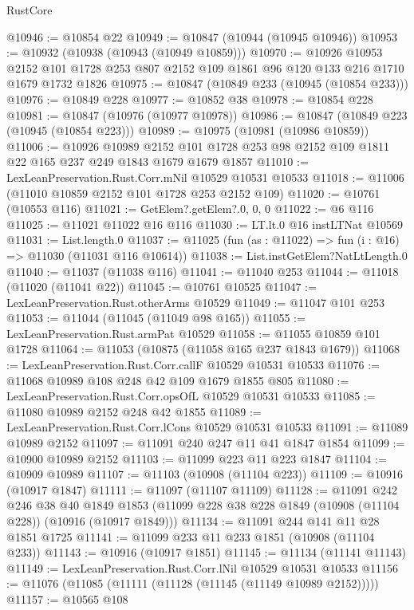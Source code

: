 \begin{lexlean}{RustCore}
\begin{coremodule}
@10946 := @10854 @22
@10949 := @10847 (@10944 (@10945 @10946))
@10953 := @10932 (@10938 (@10943 (@10949 @10859)))
@10970 := @10926
    @10953
    @2152
    @101
    @1728
    @253
    @807
    @2152
    @109
    @1861
    @96
    @120
    @133
    @216
    @1710
    @1679
    @1732
    @1826
@10975 := @10847 (@10849 @233 (@10945 (@10854 @233)))
@10976 := @10849 @228
@10977 := @10852 @38
@10978 := @10854 @228
@10981 := @10847 (@10976 (@10977 @10978))
@10986 := @10847 (@10849 @223 (@10945 (@10854 @223)))
@10989 := @10975 (@10981 (@10986 @10859))
@11006 := @10926
    @10989
    @2152
    @101
    @1728
    @253
    @98
    @2152
    @109
    @1811
    @22
    @165
    @237
    @249
    @1843
    @1679
    @1679
    @1857
@11010 := LexLeanPreservation.Rust.Corr.mNil @10529 @10531 @10533
@11018 := @11006 (@11010 @10859 @2152 @101 @1728 @253 @2152 @109)
@11020 := @10761 (@10553 @116)
@11021 := GetElem?.getElem?.{0, 0, 0}
@11022 := @6 @116
@11025 := @11021 @11022 @16 @116
@11030 := LT.lt.{0} @16 instLTNat @10569
@11031 := List.length.{0}
@11037 := @11025 (fun (as : @11022) => fun (i : @16) => @11030 (@11031 @116 @10614))
@11038 := List.instGetElem?NatLtLength.{0}
@11040 := @11037 (@11038 @116)
@11041 := @11040 @253
@11044 := @11018 (@11020 (@11041 @22))
@11045 := @10761 @10525
@11047 := LexLeanPreservation.Rust.otherArms @10529
@11049 := @11047 @101 @253
@11053 := @11044 (@11045 (@11049 @98 @165))
@11055 := LexLeanPreservation.Rust.armPat @10529
@11058 := @11055 @10859 @101 @1728
@11064 := @11053 (@10875 (@11058 @165 @237 @1843 @1679))
@11068 := LexLeanPreservation.Rust.Corr.callF @10529 @10531 @10533
@11076 := @11068 @10989 @108 @248 @42 @109 @1679 @1855 @805
@11080 := LexLeanPreservation.Rust.Corr.opsOfL @10529 @10531 @10533
@11085 := @11080 @10989 @2152 @248 @42 @1855
@11089 := LexLeanPreservation.Rust.Corr.lCons @10529 @10531 @10533
@11091 := @11089 @10989 @2152
@11097 := @11091 @240 @247 @11 @41 @1847 @1854
@11099 := @10900 @10989 @2152
@11103 := @11099 @223 @11 @223 @1847
@11104 := @10909 @10989
@11107 := @11103 (@10908 (@11104 @223))
@11109 := @10916 (@10917 @1847)
@11111 := @11097 (@11107 @11109)
@11128 := @11091
    @242
    @246
    @38
    @40
    @1849
    @1853
    (@11099 @228 @38 @228 @1849 (@10908 (@11104 @228)) (@10916 (@10917 @1849)))
@11134 := @11091 @244 @141 @11 @28 @1851 @1725
@11141 := @11099 @233 @11 @233 @1851 (@10908 (@11104 @233))
@11143 := @10916 (@10917 @1851)
@11145 := @11134 (@11141 @11143)
@11149 := LexLeanPreservation.Rust.Corr.lNil @10529 @10531 @10533
@11156 := @11076 (@11085 (@11111 (@11128 (@11145 (@11149 @10989 @2152)))))
@11157 := @10565 @108

\end{coremodule}
\end{lexlean}
